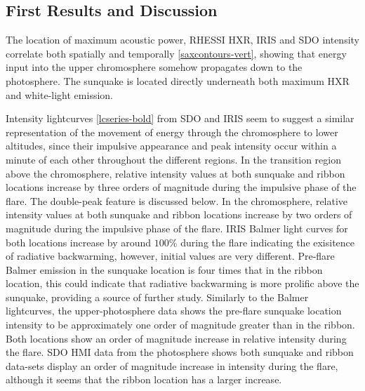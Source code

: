 \subsection{First Results and Discussion}
The location of maximum acoustic power, RHESSI HXR, IRIS and SDO intensity correlate both spatially and temporally \ref{saxcontours-vert}, showing that energy input into the upper chromosphere somehow propagates down to the photosphere. The sunquake is located directly underneath both maximum HXR and white-light emission. 

Intensity lightcurves \ref{lcseries-bold} from SDO and IRIS seem to suggest a similar representation of the movement of energy through the chromosphere to lower altitudes, since their impulsive appearance and peak intensity occur within a minute of each other throughout the different regions. In the transition region above the chromosphere, relative intensity values at both sunquake and ribbon locations increase by three orders of magnitude during the impulsive phase of the flare. The double-peak feature is discussed below. In the chromosphere, relative intensity values at both sunquake and ribbon locations increase by two orders of magnitude during the impulsive phase of the flare. IRIS Balmer light curves for both locations increase by around $100\%$ during the flare indicating the exisitence of radiative backwarming, however, initial values are very different. Pre-flare Balmer emission in the sunquake location is four times that in the ribbon location, this could indicate that radiative backwarming is more prolific above the sunquake, providing a source of further study. Similarly to the Balmer lightcurves, the upper-photosphere data shows the pre-flare sunquake location intensity to be approximately one order of magnitude greater than in the ribbon. Both locations show an order of magnitude increase in relative intensity during the flare. SDO HMI data from the photosphere shows both sunquake and ribbon data-sets display an order of magnitude increase in intensity during the flare, although it seems that the ribbon location has a larger increase.      




